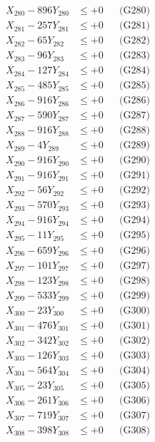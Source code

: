 \documentclass[a4paper,10pt]{article}
\begin{document}
{\begin{align}
X_{280} - 896Y_{280} &\leq +0 && \text{(G280)} \\
\allowbreak
X_{281} - 257Y_{281} &\leq +0 && \text{(G281)} \\
X_{282} - 65Y_{282} &\leq +0 && \text{(G282)} \\
X_{283} - 96Y_{283} &\leq +0 && \text{(G283)} \\
X_{284} - 127Y_{284} &\leq +0 && \text{(G284)} \\
X_{285} - 485Y_{285} &\leq +0 && \text{(G285)} \\
X_{286} - 916Y_{286} &\leq +0 && \text{(G286)} \\
X_{287} - 590Y_{287} &\leq +0 && \text{(G287)} \\
X_{288} - 916Y_{288} &\leq +0 && \text{(G288)} \\
X_{289} - 4Y_{289} &\leq +0 && \text{(G289)} \\
X_{290} - 916Y_{290} &\leq +0 && \text{(G290)} \\
\allowbreak
X_{291} - 916Y_{291} &\leq +0 && \text{(G291)} \\
X_{292} - 56Y_{292} &\leq +0 && \text{(G292)} \\
X_{293} - 570Y_{293} &\leq +0 && \text{(G293)} \\
X_{294} - 916Y_{294} &\leq +0 && \text{(G294)} \\
X_{295} - 11Y_{295} &\leq +0 && \text{(G295)} \\
X_{296} - 659Y_{296} &\leq +0 && \text{(G296)} \\
X_{297} - 101Y_{297} &\leq +0 && \text{(G297)} \\
X_{298} - 123Y_{298} &\leq +0 && \text{(G298)} \\
X_{299} - 533Y_{299} &\leq +0 && \text{(G299)} \\
X_{300} - 23Y_{300} &\leq +0 && \text{(G300)} \\
\allowbreak
X_{301} - 476Y_{301} &\leq +0 && \text{(G301)} \\
X_{302} - 342Y_{302} &\leq +0 && \text{(G302)} \\
X_{303} - 126Y_{303} &\leq +0 && \text{(G303)} \\
X_{304} - 564Y_{304} &\leq +0 && \text{(G304)} \\
X_{305} - 23Y_{305} &\leq +0 && \text{(G305)} \\
X_{306} - 261Y_{306} &\leq +0 && \text{(G306)} \\
X_{307} - 719Y_{307} &\leq +0 && \text{(G307)} \\
X_{308} - 398Y_{308} &\leq +0 && \text{(G308)} \\

\end{align}}
\end{document}
